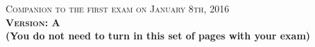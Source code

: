 \documentclass{docist}
\begin{document}
\thispagestyle{empty}

\begin{center}
  {\Large \textsc{Companion to the first exam on January 8th, 2016\\[2ex]
  \textbf{Version: A}\\[2ex]}}
  {\normalsize  \textbf{(You do not need to turn in this set of pages with your exam)}}
\end{center}




\qArchitectureInfluenceCycleOne


\qAdventureBuilderOne


\qRequirementsOne


\qArchitectureDefinitionOne


\qScenariosTacticsOne


\qModuleComponentOne


\qAvailabilityOne


\qModifiabilityOne


\qPerformanceOne


\qNginxScenariosTacticsOne


\qContinousIntegrationScenariosTacticsOne


\qInfinispanScenariosTacticsOne


\qDesigningArchitectureOne


\qModuleViewtypeOne


\qUsesGeneralizationOne

\end{document}
